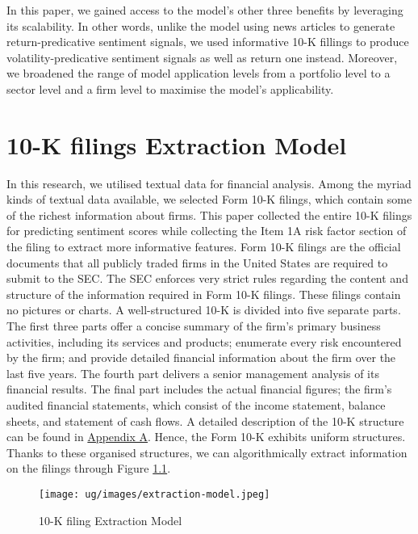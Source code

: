 \documentclass[logo,bsc,singlespacing,parskip]{infthesis}
\begin{document}
In this paper, we gained access to the model’s other three benefits by leveraging its scalability. In other words, unlike the model using news articles to generate return-predicative sentiment signals, we used informative 10-K fillings to produce volatility-predicative sentiment signals as well as return one instead. Moreover, we broadened the range of model application levels from a portfolio level to a sector level and a firm level to maximise the model’s applicability.



\chapter{10-K filings Extraction Model}
\label{extraction-model}
In this research, we utilised textual data for financial analysis. Among the myriad kinds of textual data available, we selected Form 10-K filings, which contain some of the richest information about firms. This paper collected the entire 10-K filings for predicting sentiment scores while collecting the Item 1A risk factor section of the filing to extract more informative features. Form 10-K filings are the official documents that all publicly traded firms in the United States are required to submit to the SEC. The SEC enforces very strict rules regarding the content and structure of the information required in Form 10-K filings. These filings contain no pictures or charts. A well-structured 10-K is divided into five separate parts. The first three parts offer a concise summary of the firm’s primary business activities, including its services and products; enumerate every risk encountered by the firm; and provide detailed financial information about the firm over the last five years. The fourth part delivers a senior management analysis of its financial results. The final part includes the actual financial figures; the firm’s audited financial statements, which consist of the income statement, balance sheets, and statement of cash flows. A detailed description of the 10-K structure can be found in \hyperref[appendix_10-k]{Appendix A}. Hence, the Form 10-K exhibits uniform structures. Thanks to these organised structures, we can algorithmically extract information on the filings through Figure \ref{fig:extraction-model}. \cite{Hering2016, Sha2023} 

\begin{figure}[h!]
    \centering
    \texttt{[image: ug/images/extraction-model.jpeg]}
    \caption{10-K filing Extraction Model}
    \label{fig:extraction-model}
\end{figure}
\end{document}
